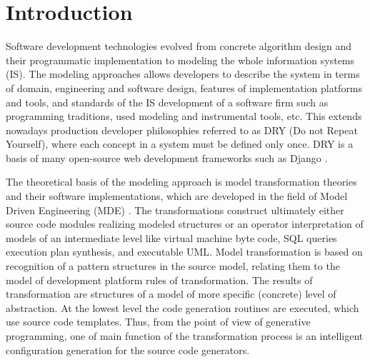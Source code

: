 \documentclass[conference]{IEEEtran}
\begin{document}
%
\IEEEpeerreviewmaketitle



\section{Introduction}
Software development technologies evolved from concrete algorithm design and their programmatic implementation to modeling the whole information systems (IS).  The modeling approaches allows developers to describe the system in terms of domain, engineering and software design, features of implementation platforms and tools, and standards of the IS development of a software firm such as programming traditions, used modeling and instrumental tools, etc.  This extends nowadays production developer philosophies referred to as DRY (Do not Repeat Yourself), where each concept in a system must be defined only once.  DRY is a basis of many open-source web development frameworks such as Django \cite{django}.

The theoretical basis of the modeling approach is model transformation theories and their software implementations, which are developed in the field of Model Driven Engineering (MDE) \cite{dde}.  The transformations construct ultimately either source code modules realizing modeled structures or an operator interpretation of models of an intermediate level like virtual machine byte code, SQL queries execution plan synthesis, and executable UML.  Model transformation is based on recognition of a pattern structures in the source model, relating them to the model of development platform rules of transformation.  The results of transformation are  structures of a model of more specific (concrete) level of abstraction.  At the lowest level the code generation routines are executed, which use source code templates.  Thus, from the point of view of generative programming, one of main function of the transformation process is an intelligent configuration generation for the source code generators.
\end{document}
